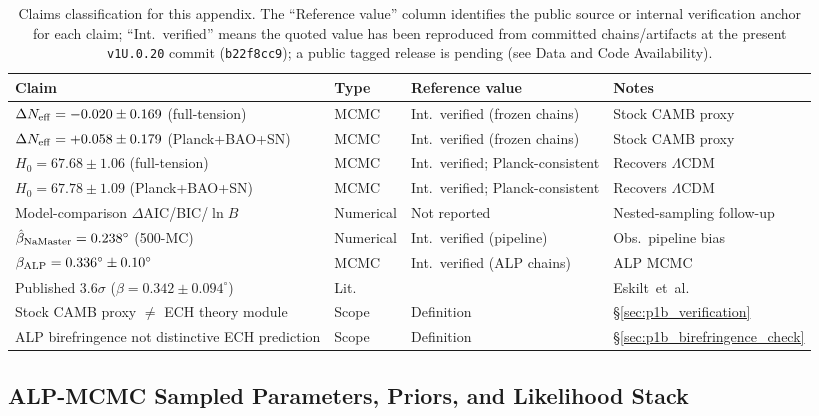 \documentclass[aps,prd,twocolumn,superscriptaddress,showpacs,preprintnumbers,nofootinbib,longbibliography,floatfix]{revtex4-2}
\newcommand{\Neff}{N_{\rm eff}}
\newcommand{\paperVersion}{v1U.0.20}
\begin{document}
\begin{table}[tb]
\caption{\label{tab:claims} Claims classification for this appendix.
The ``Reference value'' column identifies the public source or internal
verification anchor for each claim; ``Int.\ verified'' means the quoted value
has been reproduced from committed chains/artifacts at the present
\texttt{\paperVersion} commit (\texttt{b22f8cc9}); a public tagged release
is pending (see Data and Code Availability).}
\begin{ruledtabular}
\begin{tabular}{llll}
Claim & Type & Reference value & Notes \\
\hline
$\Delta\Neff = -0.020\pm 0.169$ (full-tension)         & MCMC      & Int.\ verified (frozen chains) & Stock CAMB proxy \\
$\Delta\Neff = +0.058\pm 0.179$ (Planck+BAO+SN)         & MCMC      & Int.\ verified (frozen chains) & Stock CAMB proxy \\
$H_0 = 67.68\pm 1.06$ (full-tension)                   & MCMC      & Int.\ verified; Planck-consistent & Recovers $\Lambda$CDM \\
$H_0 = 67.78\pm 1.09$ (Planck+BAO+SN)                  & MCMC      & Int.\ verified; Planck-consistent & Recovers $\Lambda$CDM \\
Model-comparison $\Delta$AIC/BIC/$\ln B$               & Numerical & Not reported & Nested-sampling follow-up \\
$\hat\beta_{\rm NaMaster} = 0.238^\circ$ (500-MC)       & Numerical & Int.\ verified (pipeline) & Obs.\ pipeline bias \\
$\beta_{\rm ALP} = 0.336^\circ\pm 0.10^\circ$         & MCMC      & Int.\ verified (ALP chains) & ALP MCMC \\
Published $3.6\sigma$ ($\beta=0.342\pm 0.094^\circ$)   & Lit.\     & \cite{Eskilt2022} & Eskilt~et~al. \\
Stock CAMB proxy $\neq$ ECH theory module              & Scope     & Definition   & §\ref{sec:p1b_verification} \\
ALP birefringence not distinctive ECH prediction        & Scope     & Definition   & §\ref{sec:p1b_birefringence_check} \\
\end{tabular}
\end{ruledtabular}
\end{table}


\subsection{ALP-MCMC Sampled Parameters, Priors, and Likelihood Stack}\label{app:alp_priors}
\end{document}
